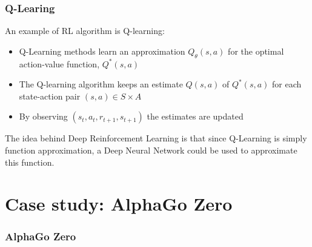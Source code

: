 \documentclass[9pt]{beamer}
\begin{document}
\begin{frame}
	\frametitle{Q-Learing}
	An example of RL algorithm is Q-learning:

	\begin{itemize}
		\item Q-Learning methods learn an approximation $Q_{\theta}(s,a)$ for the optimal action-value function, $Q^*(s,a)$
		\item The Q-learning algorithm keeps an estimate $Q(s,a)$ of $Q^*(s,a)$ for each state-action pair $(s,a) \in S \times A$
		\item By observing $(s_t, a_t, r_{t+1}, s_{t+1})$ the estimates are updated
	\end{itemize}
	
	The idea behind Deep Reinforcement Learning is that since Q-Learning is simply function approximation, a Deep Neural Network could be used to approximate this function. 

\end{frame}


\section{Case study: AlphaGo Zero}

\begin{frame}
	\frametitle{AlphaGo Zero}
	
	\tableofcontents[ 
	currentsubsection, 
	hideothersubsections, 
	sectionstyle=show/shaded,
	]
	
\end{frame}
\end{document}
